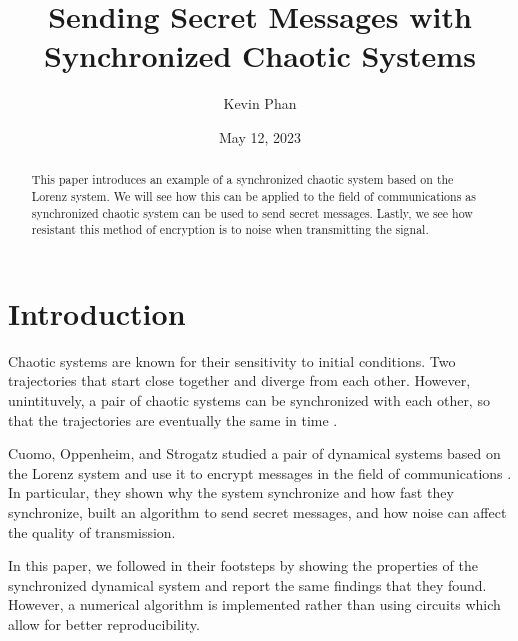 \documentclass[12pt]{article}
\title{Sending Secret Messages with Synchronized Chaotic Systems}
\author{Kevin Phan}
\date{May 12, 2023}
\begin{document}
    \maketitle

    \begin{abstract}
      This paper introduces an example of a synchronized chaotic system based on the Lorenz system. We will see how this can be applied to the field of communications as synchronized chaotic system can be used to send secret messages. Lastly, we see how resistant this method of encryption is to noise when transmitting the signal. 
    \end{abstract}

    \newpage

    \tableofcontents

    \newpage

    \section{Introduction}
    Chaotic systems are known for their sensitivity to initial conditions. Two trajectories that start close together and diverge from each other. However, unintituvely, a pair of chaotic systems can be synchronized with each other, so that the trajectories are eventually the same in time \cite{pecora}. 

    Cuomo, Oppenheim, and Strogatz studied a pair of dynamical systems based on the Lorenz system and use it to encrypt messages in the field of communications \cite{cuomo1993, expProof, chaoticnoise}. In particular, they shown why the system synchronize and how fast they synchronize, built an algorithm to send secret messages, and how noise can affect the quality of transmission. 

    In this paper, we followed in their footsteps by showing the properties of the synchronized dynamical system and report the same findings that they found. However, a numerical algorithm is implemented rather than using circuits which allow for better reproducibility. 
\end{document}
